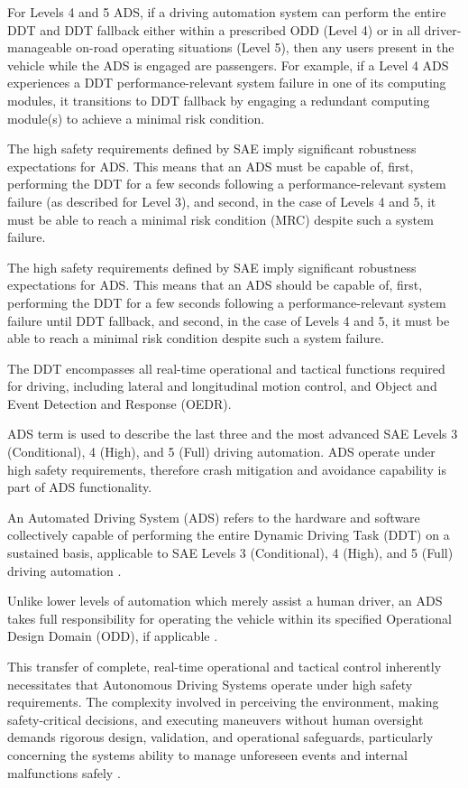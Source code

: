For Levels 4 and 5 ADS, if a driving automation system can perform the entire DDT and DDT fallback either within a prescribed ODD (Level 4) or in all driver-manageable on-road operating situations (Level 5), then any users present in the vehicle while the ADS is engaged are passengers. For example, if a Level 4 ADS experiences a DDT performance-relevant system failure in one of its computing modules, it transitions to DDT fallback by engaging a redundant computing module(s) to achieve a minimal risk condition.

The high safety requirements defined by SAE imply significant robustness expectations for ADS. This means that an ADS must be capable of, first, performing the DDT for a few seconds following a performance-relevant system failure (as described for Level 3), and second, in the case of Levels 4 and 5, it must be able to reach a minimal risk condition (MRC) despite such a system failure.

The high safety requirements defined by SAE imply significant robustness expectations for ADS. This means that an ADS should be capable of, first, performing the DDT for a few seconds following a performance-relevant system failure until DDT fallback, and second, in the case of Levels 4 and 5, it must be able to reach a minimal risk condition despite such a system failure\cite{sae:j3016:2021apr}.


The DDT encompasses all real-time operational and tactical functions required for driving, including lateral and longitudinal motion control, and Object and Event Detection and Response (OEDR).




ADS term is used to describe the last three and the most advanced SAE Levels 3 (Conditional), 4 (High), and 5 (Full) driving automation. ADS operate under high safety requirements, therefore crash mitigation and avoidance capability is part of ADS functionality.

An Automated Driving System (ADS) refers to the hardware and software
collectively capable of performing the entire Dynamic Driving Task (DDT)
on a sustained basis, applicable to SAE Levels 3 (Conditional), 4
(High), and 5 (Full) driving automation{ \textsuperscript{} }.

Unlike
lower levels of automation which merely assist a human driver, an ADS
takes full responsibility for operating the vehicle within its specified
Operational Design Domain (ODD), if applicable{ \textsuperscript{} }.

This transfer of complete, real-time operational and tactical control {
\textsuperscript{} } inherently necessitates that Autonomous Driving
Systems operate under high safety requirements. The complexity involved
in perceiving the environment, making safety-critical decisions, and
executing maneuvers without human oversight demands rigorous design,
validation, and operational safeguards, particularly concerning the
system\textquotesingle s ability to manage unforeseen events and
internal malfunctions safely{ \textsuperscript{} }. { ~ }

